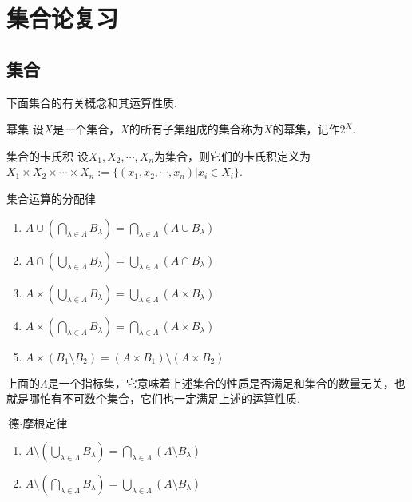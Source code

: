 \chapter{集合论复习}

\section{集合}

下面集合的有关概念和其运算性质.

\begin{definition}{幂集}
    设$X$是一个集合，$X$的所有子集组成的集合称为$X$的幂集，记作$2^X$.
\end{definition}

\begin{definition}{集合的卡氏积}
    设$X_1,X_2,\cdots,X_n$为集合，则它们的卡氏积定义为$X_1\times X_2\times\cdots\times X_n := \big\{(x_1,x_2,\cdots,x_n)|x_i\in X_i\big\}$.
\end{definition}

\begin{proposition}{集合运算的分配律}
    \wideline
    \begin{enumerate}
        \item $A\cup \left(\bigcap_{\lambda\in\Lambda}B_\lambda\right)=\bigcap_{\lambda\in\Lambda}{\left(A\cup B_\lambda\right)}$
        \item $A\cap \left(\bigcup_{\lambda\in\Lambda}B_\lambda\right)=\bigcup_{\lambda\in\Lambda}{\left(A\cap B_\lambda\right)}$
        \item $A\times \left(\bigcup_{\lambda\in\Lambda}B_\lambda\right)=\bigcup_{\lambda\in\Lambda}{\left(A\times B_\lambda\right)}$
        \item $A\times \left(\bigcap_{\lambda\in\Lambda}B_\lambda\right)=\bigcap_{\lambda\in\Lambda}{\left(A\times B_\lambda\right)}$
        \item $A\times \left(B_1\setminus B_2\right)=(A\times B_1)\setminus (A\times B_2)$
    \end{enumerate}
\end{proposition}
上面的$\Lambda$是一个指标集，它意味着上述集合的性质是否满足和集合的数量无关，也就是哪怕有不可数个集合，它们也一定满足上述的运算性质.

\begin{theorem}{$\text{德}\cdot\text{摩根定律}$}
    \wideline
    \begin{enumerate}
        \item $A\setminus \left(\bigcup_{\lambda\in\Lambda}{B_{\lambda}}\right)=\bigcap_{\lambda\in\Lambda}{\left(A\setminus B_{\lambda}\right)}$
        \item $A\setminus \left(\bigcap_{\lambda\in\Lambda}{B_{\lambda}}\right)=\bigcup_{\lambda\in\Lambda}{\left(A\setminus B_{\lambda}\right)}$
    \end{enumerate}
\end{theorem}

